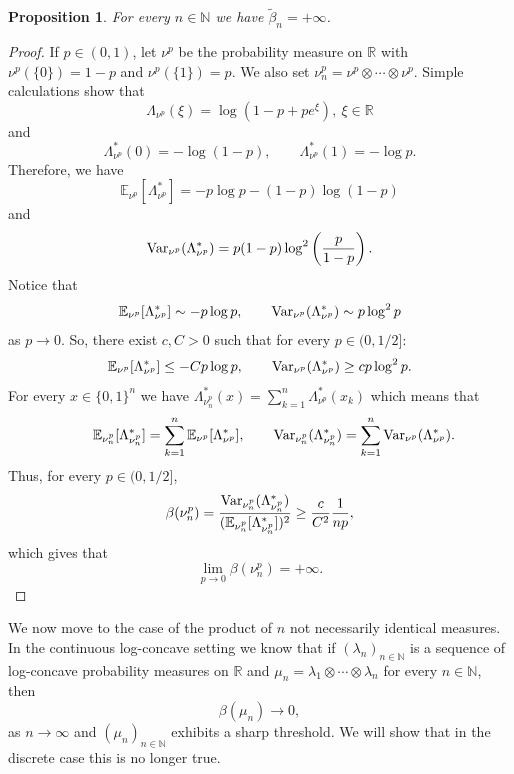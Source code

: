 \documentclass[11pt,a4paper]{article} %
\newtheorem{proposition}[theorem]{Proposition}
\theoremstyle{definition}
\theoremstyle{remark}
\newcommand{\1}{\mathds{1}}
\begin{document}
\begin{proposition}
    For every $n \in \mathbb{N}$ we have $\tilde{\beta}_n=+\infty$.
\end{proposition}

\begin{proof}
    If $p \in (0,1)$, let $\nu^p $ be the probability measure on $\mathbb{R}$ with $\nu^p(\{0\})=1-p$ and $\nu^p(\{1\})=p $. We also set $\nu^p_n=\nu^p\otimes\cdots\otimes\nu^p$. Simple calculations show that $$\Lambda_{\nu^p}(\xi)=\log (1-p+pe^\xi), \ \xi \in \mathbb{R}$$
    and $$\Lambda^{\ast}_{\nu^p}(0)=-\log(1-p), \qquad \Lambda^{\ast}_{\nu^p}(1)=-\log p.$$
    Therefore, we have \begin{equation}\label{eq:expectation-bernoulli}
    \mathbb{E}_{\nu^p}[\Lambda^{\ast}_{\nu^p}]=-p \log p -(1-p) \log(1-p)
    \end{equation}
    and $${\rm Var}_{\nu^p}(\Lambda^{\ast}_{\nu^p})=p(1-p)\log^2\left( \frac{p}{1-p} \right).$$
    Notice that 
    \begin{equation}\label{eq:asymptotics}\mathbb{E}_{\nu^p}[\Lambda^{\ast}_{\nu^p}] \sim -p \log p, \qquad {\rm Var}_{\nu^p}(\Lambda^{\ast}_{\nu^p}) \sim p \log^2 p
    \end{equation} 
    as $p \to 0$. So, there exist $c,C>0$ such that for every $p \in (0,1/2]:$
        $$\mathbb{E}_{\nu^p}[\Lambda^{\ast}_{\nu^p}] \leq -Cp \log p, \qquad {\rm Var}_{\nu^p}(\Lambda^{\ast}_{\nu^p}) \geq cp \log^2 p.$$ For every $x \in \{0,1\}^n$ we have $\Lambda^{\ast}_{\nu^p_n}(x)= \sum\limits_{k=1}^{n} \Lambda^{\ast}_{\nu^p}(x_k)$ which means that $$ \qquad \mathbb{E}_{\nu^p_n}[\Lambda^{\ast}_{\nu^p_n}]=\sum\limits_{k=1}^{n} \mathbb{E}_{\nu^p}[\Lambda^{\ast}_{\nu^p}], \qquad {\rm Var}_{\nu^p_n}(\Lambda^{\ast}_{\nu^p_n})=\sum\limits_{k=1}^{n} {\rm Var}_{\nu^p}(\Lambda^{\ast}_{\nu^p}).$$ 
    Thus, for every $p \in (0, 1/2]$, $$\beta(\nu^p_n)=\frac{{\rm Var}_{\nu^p_n}(\Lambda^{\ast}_{\nu^p_n})}{(\mathbb{E}_{\nu^p_n}[\Lambda^{\ast}_{\nu^p_n}])^2} \geq \frac{c}{C^2}\frac{1}{np},$$ which gives that $$\lim\limits_{p \to 0} \beta(\nu_n^p)=+\infty.$$
    \end{proof}

    

We now move to the case of the product of $n$ not necessarily identical measures. In the continuous log-concave setting we know that if $(\lambda_n)_{n \in \mathbb{N}}$ is a sequence of log-concave probability measures on $\mathbb{R}$ and $\mu_n= \lambda_1 \otimes\cdots\otimes \lambda_n$ for every $n \in \mathbb{N}$, then $$\beta(\mu_n) \to 0,$$ as $n \to \infty$ and $(\mu_n)_{n \in \mathbb{N}}$ exhibits a sharp threshold. We will show that in the discrete case this is no longer true.
\end{document}
